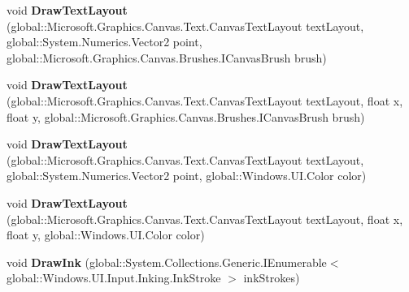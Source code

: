 \begin{DoxyCompactItemize}
\item 
\mbox{\label{class_microsoft_1_1_graphics_1_1_canvas_1_1_canvas_drawing_session_ac411bf305542173da9359ddcec59b4f8}} 
void {\bfseries Draw\+Text\+Layout} (global\+::\+Microsoft.\+Graphics.\+Canvas.\+Text.\+Canvas\+Text\+Layout text\+Layout, global\+::\+System.\+Numerics.\+Vector2 point, global\+::\+Microsoft.\+Graphics.\+Canvas.\+Brushes.\+I\+Canvas\+Brush brush)
\item 
\mbox{\label{class_microsoft_1_1_graphics_1_1_canvas_1_1_canvas_drawing_session_afd9a250b03dc041f2fd9ab19b86e51b0}} 
void {\bfseries Draw\+Text\+Layout} (global\+::\+Microsoft.\+Graphics.\+Canvas.\+Text.\+Canvas\+Text\+Layout text\+Layout, float x, float y, global\+::\+Microsoft.\+Graphics.\+Canvas.\+Brushes.\+I\+Canvas\+Brush brush)
\item 
\mbox{\label{class_microsoft_1_1_graphics_1_1_canvas_1_1_canvas_drawing_session_ac7050f4cc17cf5890039e48bc61d06c9}} 
void {\bfseries Draw\+Text\+Layout} (global\+::\+Microsoft.\+Graphics.\+Canvas.\+Text.\+Canvas\+Text\+Layout text\+Layout, global\+::\+System.\+Numerics.\+Vector2 point, global\+::\+Windows.\+U\+I.\+Color color)
\item 
\mbox{\label{class_microsoft_1_1_graphics_1_1_canvas_1_1_canvas_drawing_session_a70f84504ad50ff1b7aacfb5c1b7b1979}} 
void {\bfseries Draw\+Text\+Layout} (global\+::\+Microsoft.\+Graphics.\+Canvas.\+Text.\+Canvas\+Text\+Layout text\+Layout, float x, float y, global\+::\+Windows.\+U\+I.\+Color color)
\item 
\mbox{\label{class_microsoft_1_1_graphics_1_1_canvas_1_1_canvas_drawing_session_acfbfbd4b3a3c2452d280fe9995b664b5}} 
void {\bfseries Draw\+Ink} (global\+::\+System.\+Collections.\+Generic.\+I\+Enumerable$<$ global\+::\+Windows.\+U\+I.\+Input.\+Inking.\+Ink\+Stroke $>$ ink\+Strokes)
\item 
\mbox{\label{class_microsoft_1_1_graphics_1_1_canvas_1_1_canvas_drawing_session_ac9670075cd7d03e36032cfa2ec5be7be}} 

\end{DoxyCompactItemize}
